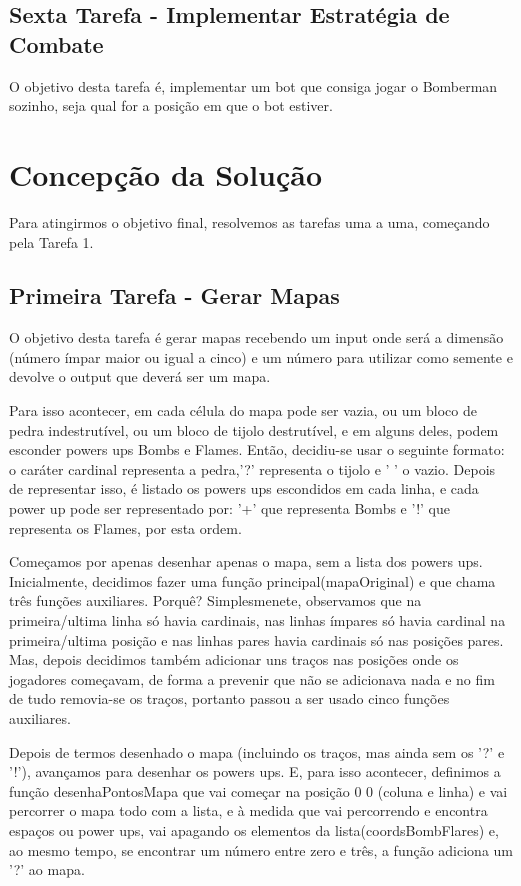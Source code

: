 \documentclass[a4paper]{article}
\begin{document}
\subsection{Sexta Tarefa - Implementar Estratégia de Combate}
\label{subsec:tarefa6}
O objetivo desta tarefa é, implementar um bot que consiga jogar o Bomberman sozinho, seja qual for
a posição em que o bot estiver.

\section{Concepção da Solução}
\label{sec:solucao}

Para atingirmos o objetivo final, resolvemos as tarefas uma a uma, começando pela Tarefa 1.

\subsection{Primeira Tarefa - Gerar Mapas}
\label{subsec:tarefa1sol}

O objetivo desta tarefa é gerar mapas recebendo um input onde será a dimensão
(número ímpar maior ou igual a cinco) e um número para utilizar como semente e devolve o output que deverá ser um mapa.

Para isso acontecer, em cada célula do mapa pode ser vazia, ou um bloco de pedra indestrutível, ou um
bloco de tijolo destrutível, e em alguns deles, podem esconder powers ups Bombs e
Flames. Então, decidiu-se usar o seguinte formato: o caráter cardinal representa a pedra,'?' representa o tijolo e ' ' o vazio. Depois de representar isso,
é listado os powers ups escondidos em cada linha, e cada power up pode ser representado por: '+' que representa Bombs e '!' que representa os Flames, por esta ordem.

Começamos por apenas desenhar apenas o mapa, sem a lista dos powers ups. Inicialmente, decidimos fazer uma função principal(mapaOriginal) e que chama três funções auxiliares. Porquê? Simplesmenete, observamos que
na primeira/ultima linha só havia cardinais, nas linhas ímpares só havia cardinal na primeira/ultima posição e nas linhas pares havia cardinais só nas posições pares. Mas, depois decidimos
também adicionar uns traços nas posições onde os jogadores começavam, de forma a prevenir que não se adicionava nada e no fim de tudo removia-se os traços, portanto passou a ser usado cinco funções auxiliares.

Depois de termos desenhado o mapa (incluindo os traços, mas ainda sem os '?' e '!'), avançamos para desenhar os powers ups. E, para isso acontecer, definimos a função desenhaPontosMapa que vai começar na posição
0 0 (coluna e linha) e vai percorrer o mapa todo com a lista, e à medida que vai percorrendo e encontra espaços ou power ups, vai apagando os elementos da lista(coordsBombFlares) e, ao mesmo tempo, se encontrar um número entre zero e três, a função adiciona um '?' ao mapa.
\end{document}
